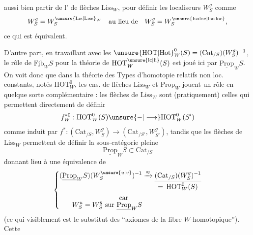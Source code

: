 aussi bien partir de l' de flèches $\mathrm{Liss}_W$, pour définir les localiseurs $W_S^g$ comme
\[
W_S^g=W_S^{\unsure{\mathrm{Lis}|\mathrm{Liss}}_W}\quad\text{au lieu de}\quad
W_S^g=W_S^{\unsure{\mathrm{Isoloc}|\mathrm{Iso\,loc}}},
\]
ce qui est équivalent.

D'autre part, en travaillant avec les  $\unsure{\mathrm{HOT}|\mathrm{Hot}}_W^0(S)=(\mathrm{Cat}_{/S})(W_S^g)^{-1}$, le rôle de $\underline{\mathrm{Fib}}_W S$ pour la théorie de $\mathrm{HOT}^{\unsure{\mathrm{lc}|\mathrm{li}}}_W(S)$ est joué ici par $\underline{\mathrm{Prop}}_W S$. On voit donc que dans la théorie des Types d'homotopie relatifs non loc. constants, notés $\mathrm{HOT}_W^0$, les ens. de flèches $\mathrm{Liss}_W$ et $\mathrm{Prop}_W$ jouent un rôle en quelque sorte complémentaire : les flèches  de $\mathrm{Liss}_W$ sont (pratiquement) celles qui permettent directement de définir
\[
f_W^{*0}:\mathrm{HOT}_W^0(S)\unsure{-|\longrightarrow}\mathrm{HOT}_W^0(S')
\]
comme induit par $f^*:(\mathrm{Cat}_{/S},W_S^g)\longrightarrow(\mathrm{Cat}_{/S'},W_{S'}^g)$,
tandis que les flèches de $\mathrm{Liss}_W$ permettent de définir  la sous-catégorie pleine
\[
\underline{\mathrm{Prop}}_W S\subset\mathrm{Cat}_{/S}
\]
donnant lieu à une équivalence de 
\[
\left\{\begin{aligned}
(\underline{\mathrm{Prop}}_W S)(W_S^{\unsure{u|v}})^{-1}&\xrightarrow{\approx}
\underset{\displaystyle =\,\mathrm{HOT}_W^0(S)}{\underline{(\mathrm{Cat}_{/S})(W_S^g)^{-1}}}\\
\text{car}\qquad &\\[-5pt]
W_S^u=W_S^g\ \text{sur } \underline{\mathrm{Prop}}_W S&
\end{aligned}\right.
\]
(ce qui visiblement est le substitut  des ``axiomes de la  fibre $W$-homotopique''). Cette
